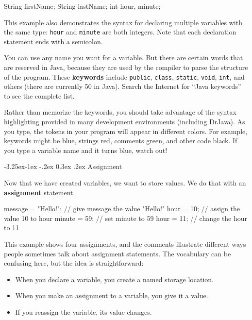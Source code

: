 \documentclass[12pt]{book}
\makeatletter
\renewcommand\subsection{\@startsection{subsection}{2}{\z@}%
    {-3.25ex\@plus -1ex \@minus -.2ex}%
    {0.3ex \@plus .2ex}%
    {\normalfont\large\bfseries}}
\theoremstyle{exercise}
\newcommand{\java}[1]{\lstinline{#1}} %
\makeatother
\begin{document}
\begin{code}
    String firstName;
    String lastName;
    int hour, minute;
\end{code}

This example also demonstrates the syntax for declaring multiple variables with the same type: \java{hour} and \java{minute} are both integers.
Note that each declaration statement ends with a semicolon.

You can use any name you want for a variable.
But there are certain words that are reserved in Java, because they are used by the compiler to parse the structure of the program.
These {\bf keywords} include \java{public}, \java{class}, \java{static}, \java{void}, \java{int}, and others (there are currently 50 in Java).
Search the Internet for ``Java keywords'' to see the complete list.


Rather than memorize the keywords, you should take advantage of the syntax highlighting provided in many development environments (including DrJava).
As you type, the tokens in your program will appear in different colors.
For example, keywords might be blue, strings red, comments green, and other code black.
If you type a variable name and it turns blue, watch out!

\subsection{Assignment}


Now that we have created variables, we want to store values.
We do that with an {\bf assignment} statement.

\begin{code}
    message = "Hello!";  // give message the value "Hello!"
    hour = 10;           // assign the value 10 to hour
    minute = 59;         // set minute to 59
    hour = 11;           // change the hour to 11
\end{code}

This example shows four assignments, and the comments illustrate different ways people sometimes talk about assignment statements.
The vocabulary can be confusing here, but the idea is straightforward:

\begin{itemize}
\item When you declare a variable, you create a named storage location.
\item When you make an assignment to a variable, you give it a value.
\item If you reassign the variable, its value changes.
\end{itemize}
\end{document}
